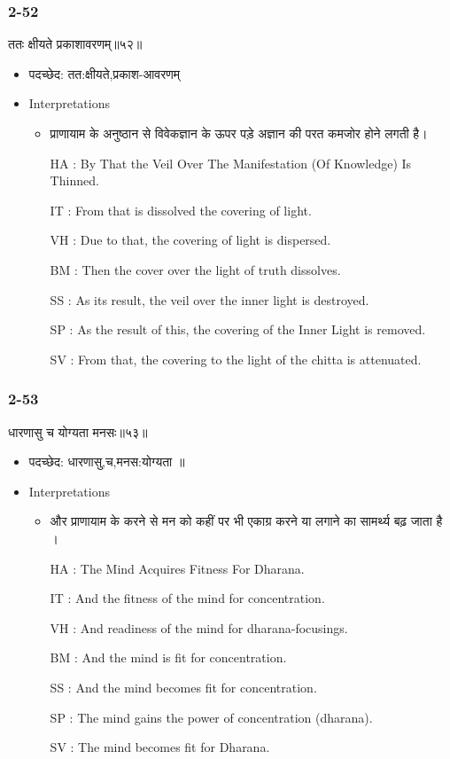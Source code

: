 \begin{frame}[fragile]\frametitle{2-52}
\begin{sanskrit}
ततः क्षीयते प्रकाशावरणम्॥५२॥
\end{sanskrit}

	\begin{itemize}
	\item पदच्छेद: तत:क्षीयते,प्रकाश-आवरणम्
	\item Interpretations
		\begin{itemize}
		\item प्राणायाम के अनुष्ठान से विवेकज्ञान के ऊपर पड़े अज्ञान की परत कमजोर होने लगती है।
		\item [HA]: By That the Veil Over The Manifestation (Of Knowledge) Is Thinned.
		\item [IT]: From that is dissolved the covering of light.
		\item [VH]: Due to that, the covering of light is dispersed.
		\item [BM]: Then the cover over the light of truth dissolves.
		\item [SS]: As its result, the veil over the inner light is destroyed.
		\item [SP]: As the result of this, the covering of the Inner Light is removed.
		\item [SV]: From that, the covering to the light of the chitta is attenuated. 
		\end{itemize}
	\end{itemize}	
\end{frame}
\begin{frame}[fragile]\frametitle{2-53}
\begin{sanskrit}
धारणासु च योग्यता मनसः॥५३॥
\end{sanskrit}

	\begin{itemize}
	\item पदच्छेद: धारणासु,च,मनस:योग्यता ॥
	\item Interpretations
		\begin{itemize}
		\item और प्राणायाम के करने से मन को कहीं पर भी एकाग्र करने या लगाने का सामर्थ्य बढ़ जाता है ।
		\item [HA]: The Mind Acquires Fitness For Dharana.
		\item [IT]: And the fitness of the mind for concentration.
		\item [VH]: And readiness of the mind for dharana-focusings.
		\item [BM]: And the mind is fit for concentration.
		\item [SS]: And the mind becomes fit for concentration.
		\item [SP]: The mind gains the power of concentration (dharana).
		\item [SV]: The mind becomes fit for Dharana. 
		\end{itemize}
	\end{itemize}	
\end{frame}

